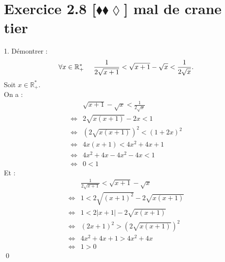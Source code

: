 \documentclass[10pt]{article}
\begin{document}
\section*{Exercice 2.8 [$\blacklozenge\blacklozenge\lozenge$] mal de crane tier}
\begin{tcolorbox}[enhanced, width=7in, center, size=fbox, fontupper=\large, drop shadow southwest]
    1. Démontrer : 
    \begin{equation*}
        \forall{x\in\mathbb{R}^*_+}\hspace{0.5cm}\frac{1}{2\sqrt{x+1}}<\sqrt{x+1}-\sqrt{x}<\frac{1}{2\sqrt{x}}.
    \end{equation*}
    Soit $x\in\mathbb{R}^*_+$.\\
    On a :
    \begin{align*}
        &\sqrt{x+1}-\sqrt{x}<\frac{1}{2\sqrt{x}}\\
        \iff&2\sqrt{x(x+1)}-2x<1\\
        \iff&(2\sqrt{x(x+1)})^2<(1+2x)^2\\
        \iff&4x(x+1)<4x^2+4x+1\\
        \iff&4x^2+4x-4x^2-4x<1\\
        \iff&0<1
    \end{align*}
    Et :
    \begin{align*}
        &\frac{1}{2\sqrt{x+1}}<\sqrt{x+1}-\sqrt{x}\\
        \iff&1<2\sqrt{(x+1)^2}-2\sqrt{x(x+1)}\\
        \iff&1<2|x+1|-2\sqrt{x(x+1)}\\
        \iff&(2x+1)^2>(2\sqrt{x(x+1)})^2\\
        \iff&4x^2+4x+1>4x^2+4x\\
        \iff&1>0
    \end{align*}
    \qed
\end{tcolorbox}
\end{document}
